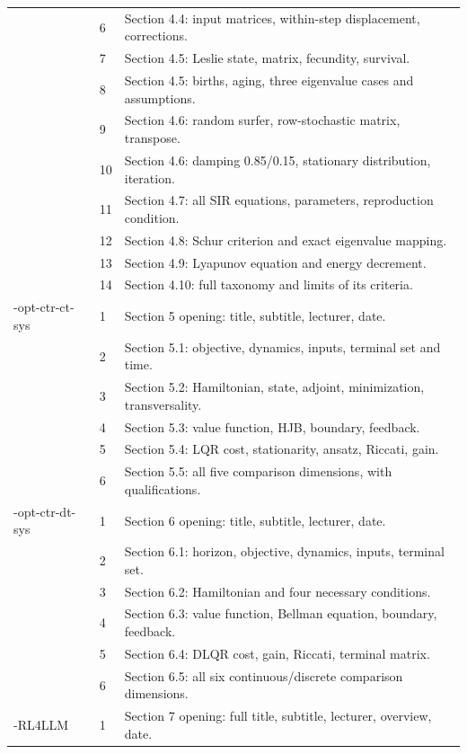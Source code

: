 \documentclass[11pt,a4paper]{article}
\numberwithin{equation}{section}
\numberwithin{figure}{section}
\numberwithin{table}{section}
\begin{document}
\begin{longtable}{@{}P{29mm}P{14mm}P{105mm}@{}}
 & 6 & Section 4.4: input matrices, within-step displacement, corrections.\\
 & 7 & Section 4.5: Leslie state, matrix, fecundity, survival.\\
 & 8 & Section 4.5: births, aging, three eigenvalue cases and assumptions.\\
 & 9 & Section 4.6: random surfer, row-stochastic matrix, transpose.\\
 & 10 & Section 4.6: damping 0.85/0.15, stationary distribution, iteration.\\
 & 11 & Section 4.7: all SIR equations, parameters, reproduction condition.\\
 & 12 & Section 4.8: Schur criterion and exact eigenvalue mapping.\\
 & 13 & Section 4.9: Lyapunov equation and energy decrement.\\
 & 14 & Section 4.10: full taxonomy and limits of its criteria.\\
-\allowbreak opt-\allowbreak ctr-\allowbreak ct-\allowbreak sys & 1 & Section 5 opening: title, subtitle, lecturer, date.\\
 & 2 & Section 5.1: objective, dynamics, inputs, terminal set and time.\\
 & 3 & Section 5.2: Hamiltonian, state, adjoint, minimization, transversality.\\
 & 4 & Section 5.3: value function, HJB, boundary, feedback.\\
 & 5 & Section 5.4: LQR cost, stationarity, ansatz, Riccati, gain.\\
 & 6 & Section 5.5: all five comparison dimensions, with qualifications.\\
-\allowbreak opt-\allowbreak ctr-\allowbreak dt-\allowbreak sys & 1 & Section 6 opening: title, subtitle, lecturer, date.\\
 & 2 & Section 6.1: horizon, objective, dynamics, inputs, terminal set.\\
 & 3 & Section 6.2: Hamiltonian and four necessary conditions.\\
 & 4 & Section 6.3: value function, Bellman equation, boundary, feedback.\\
 & 5 & Section 6.4: DLQR cost, gain, Riccati, terminal matrix.\\
 & 6 & Section 6.5: all six continuous/discrete comparison dimensions.\\
-\allowbreak RL4LLM & 1 & Section 7 opening: full title, subtitle, lecturer, overview, date.\\

\end{longtable}
\end{document}
